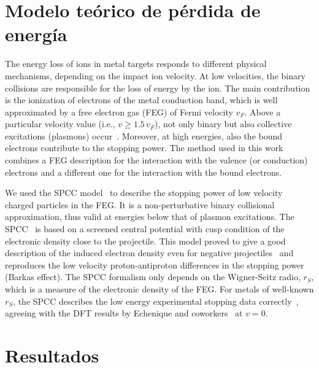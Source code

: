 \section{Modelo teórico de pérdida de energía}
\label{sec:method-stopping}


The energy loss of ions in metal targets responds to different physical 
mechanisms, depending on the impact ion velocity. At low velocities, the 
binary collisions are responsible for the loss of energy by the ion. 
The main contribution is the ionization of electrons of the metal 
conduction band, which is well approximated by a free electron gas (FEG) 
of Fermi velocity $v_F$. Above a particular velocity value (i.e., 
$v\geq 1.5\,v_F$), not only binary but also collective excitations 
(plasmons) occur~\cite{mon17}. Moreover, at high energies, also the 
bound electrons contribute to the stopping power. The method used in 
this work combines a FEG description for the interaction with the 
valence (or conduction) electrons and a different one for the 
interaction with the bound electrons.

We used the SPCC model~\cite{mon17} to describe the stopping power of 
low velocity charged particles in the FEG. It is a non-perturbative 
binary collisional approximation, thus valid at energies below that of 
plasmon excitations.  The SPCC~\cite{mon17} is based on a screened 
central potential with cusp condition of the electronic density close 
to the projectile. This model proved to give a good description of the 
induced electron density even for negative projectiles~\cite{mon17} 
and reproduces the low velocity proton-antiproton differences in the 
stopping power (Barkas effect). The SPCC formalism only depends on the 
Wigner-Seitz radio, $r_S$, which is a measure of the electronic density 
of the FEG. For metals of well-known $r_S$, the SPCC describes the low 
energy experimental stopping data correctly~\cite{mon17}, agreeing with 
the DFT results by Echenique and coworkers~\cite{eche81,nagy89} at $v=0$. 



\section{Resultados}
\label{sec:results-heavy}


